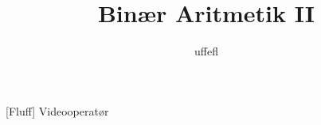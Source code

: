 \documentclass[a4paper,11pt]{article}
\title{Binær Aritmetik II}
\author{uffefl}
\begin{document}
\maketitle

\begin{roles}
[Fluff] Videooperatør
\end{roles}

\begin{props}
\prop{}
\end{props}

\begin{sketch}


\end{sketch}
\end{document}

